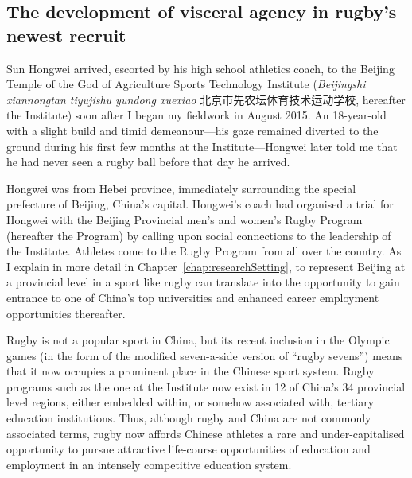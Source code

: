                                   \begin{CJK}{UTF8}{gbsn}

\section{The development of visceral agency in rugby's newest recruit\label{sect:SHW}}
Sun Hongwei arrived, escorted by his high school athletics coach, to the Beijing Temple of the God of Agriculture Sports Technology Institute (\textit{Beijingshi xiannongtan tiyujishu yundong xuexiao} 北京市先农坛体育技术运动学校,
hereafter the Institute) soon after I began my fieldwork in August 2015.  An 18-year-old with a slight build and timid demeanour---his gaze remained diverted to the ground during his first few months at the Institute---Hongwei later told me that he had never seen a rugby ball before that day he arrived.

Hongwei was from Hebei province, immediately surrounding the special prefecture of Beijing, China's capital.  Hongwei's coach had organised a trial for Hongwei with the Beijing Provincial men's and women's Rugby Program (hereafter the Program) by calling upon social connections to the leadership of the Institute.  Athletes come to the Rugby Program from all over the country.  As I explain in more detail in Chapter~\ref{chap:researchSetting}, to represent Beijing at a provincial level in a sport like rugby can translate into the opportunity to gain entrance to one of China's top universities and enhanced career employment opportunities thereafter.

Rugby is not a popular sport in China, but its recent inclusion in the Olympic games (in the form of the modified seven-a-side version of ``rugby sevens'') means that it now occupies a prominent place in the Chinese sport system.  Rugby programs such as the one at the Institute now exist in 12 of China's 34 provincial level regions, either embedded within, or somehow associated with, tertiary education institutions.  Thus, although rugby and China are not commonly associated terms, rugby now affords Chinese athletes a rare and under-capitalised opportunity to pursue attractive life-course opportunities of education and employment in an intensely competitive education system.


\end{CJK}
